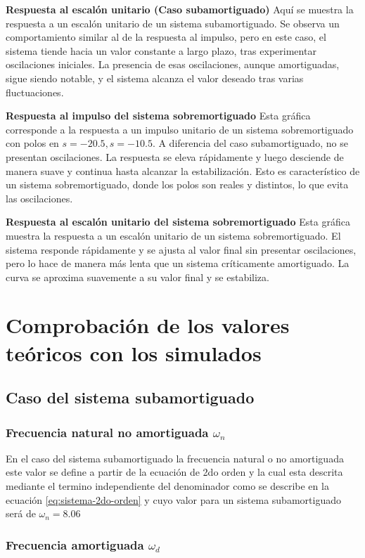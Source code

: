 \documentclass[conference]{IEEEtran}
\begin{document}
	\textbf{Respuesta al escalón unitario (Caso subamortiguado)}
	Aquí se muestra la respuesta a un escalón unitario de un sistema subamortiguado. Se observa un comportamiento similar al de la respuesta al impulso, pero en este caso, el sistema tiende hacia un valor constante a largo plazo, tras experimentar oscilaciones iniciales. La presencia de esas oscilaciones, aunque amortiguadas, sigue siendo notable, y el sistema alcanza el valor deseado tras varias fluctuaciones.
	
	\textbf{Respuesta al impulso del sistema sobremortiguado}
	Esta gráfica corresponde a la respuesta a un impulso unitario de un sistema sobremortiguado con polos en 
	$ s = -20.5, s = -10.5$. A diferencia del caso subamortiguado, no se presentan oscilaciones. La respuesta se eleva rápidamente y luego desciende de manera suave y continua hasta alcanzar la estabilización. Esto es característico de un sistema sobremortiguado, donde los polos son reales y distintos, lo que evita las oscilaciones.
	
	\textbf{Respuesta al escalón unitario del sistema sobremortiguado}
	Esta gráfica muestra la respuesta a un escalón unitario de un sistema sobremortiguado. El sistema responde rápidamente y se ajusta al valor final sin presentar oscilaciones, pero lo hace de manera más lenta que un sistema críticamente amortiguado. La curva se aproxima suavemente a su valor final y se estabiliza.
	
	\section{Comprobación de los valores teóricos con los simulados}
	\subsection{Caso del sistema subamortiguado}
	\subsubsection{Frecuencia natural no amortiguada $\omega_n$}
	En el caso del sistema subamortiguado la frecuencia natural o no amortiguada este valor se define a partir de la ecuación de 2do orden y la cual esta descrita mediante el termino independiente del denominador como se describe en la ecuación \ref{eq:sistema-2do-orden} y cuyo valor para un sistema subamortiguado será de $\omega_n = 8.06$
	
	\subsubsection{Frecuencia amortiguada $\omega_d$}
	
\end{document}
